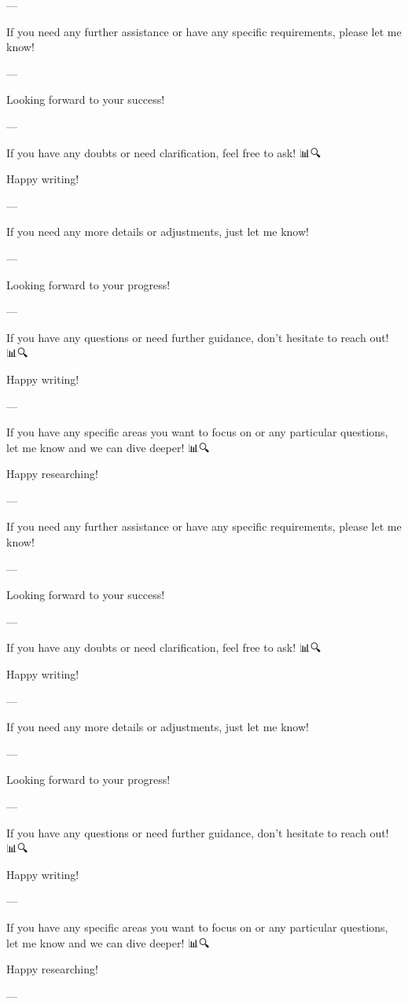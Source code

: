--- 

If you need any further assistance or have any specific requirements, please let me know! 🙌

--- 

Looking forward to your success! 🚀🌟

--- 

If you have any doubts or need clarification, feel free to ask! 📊🔍

Happy writing! 📝✨

--- 

If you need any more details or adjustments, just let me know! 🙌

--- 

Looking forward to your progress! 🚀🌟

--- 

If you have any questions or need further guidance, don't hesitate to reach out! 📊🔍

Happy writing! 📝✨

--- 

If you have any specific areas you want to focus on or any particular questions, let me know and we can dive deeper! 📊🔍

Happy researching! 📝🚀

--- 

If you need any further assistance or have any specific requirements, please let me know! 🙌

--- 

Looking forward to your success! 🚀🌟

--- 

If you have any doubts or need clarification, feel free to ask! 📊🔍

Happy writing! 📝✨

--- 

If you need any more details or adjustments, just let me know! 🙌

--- 

Looking forward to your progress! 🚀🌟

--- 

If you have any questions or need further guidance, don't hesitate to reach out! 📊🔍

Happy writing! 📝✨

--- 

If you have any specific areas you want to focus on or any particular questions, let me know and we can dive deeper! 📊🔍

Happy researching! 📝🚀

--- 

